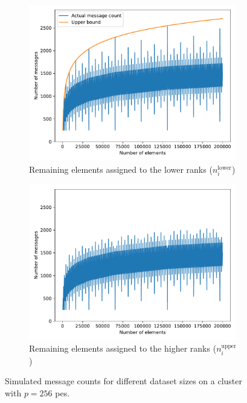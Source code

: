 \begin{figure}[b]
\centering
\begin{subfigure}{0.48\textwidth}
\centering
\includegraphics[width=1.0\textwidth]{figures/message_count_256.pdf}
\caption{Remaining elements assigned to the lower ranks ($n_i^\textrm{lower}$)}
\label{fig:messageCount256Lower}
\end{subfigure}
\hfill
\begin{subfigure}{0.48\textwidth}
\centering
\includegraphics[width=1.0\textwidth]{figures/message_count_256_remainder_at_end.pdf}
\caption{Remaining elements assigned to the higher ranks ($n_i^\textrm{upper}$)}
\label{fig:messageCount256Upper}
\end{subfigure}
\caption{Simulated message counts for different dataset sizes on a cluster with $p=256$ \glspl{pe}.}
\label{fig:messageCount256}
\end{figure}

